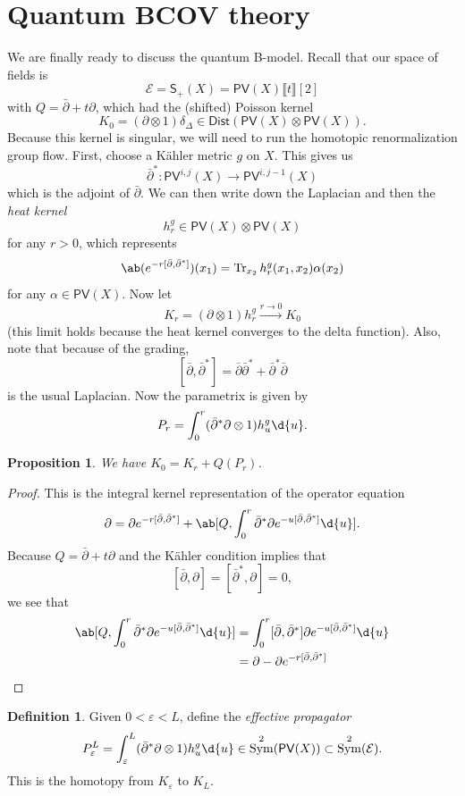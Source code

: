 \documentclass{amsart}
\newtheorem{prop}[thm]{Proposition}
\theoremstyle{definition}
\newtheorem{defn}[thm]{Definition}
\theoremstyle{remark}
\theoremstyle{plain}
\theoremstyle{definition}
\theoremstyle{remark}
\newcommand{\ep}{\varepsilon}
\newcommand{\mc}[1]{\mathcal{#1}}
\newcommand{\on}[1]{\operatorname{#1}}
\newcommand{\ms}[1]{\mathsf{#1}}
\newcommand{\1}{\mathbf{1}}
\newcommand{\2}{\mathbf{2}}
\newcommand{\3}{\mathbf{3}}
\newcommand{\ps}[1]{\lBrack #1 \rBrack}
\newcommand{\dbar}{\bar{\partial}}
\DeclareMathOperator{\Sym}{Sym}
\begin{document}
\section{Quantum BCOV theory}%
\label{sec:Quantum BCOV theory}

We are finally ready to discuss the quantum B-model. Recall that our space of fields is
\[ \mc{E} = \ms{S}_+(X) = \ms{PV}(X) \ps{t}[2] \]
with \(Q = \dbar + t \partial\), which had the (shifted) Poisson kernel
\[ K_0 = (\partial \otimes 1) \delta_{\Delta} \in \ms{Dist}(\ms{PV}(X) \otimes \ms{PV}(X)). \]
Because this kernel is singular, we will need to run the homotopic renormalization group flow. First, choose a K\"ahler metric \(g\) on \(X\). This gives us
\[ \dbar^* \colon \ms{PV}^{i,j}(X) \to \ms{PV}^{i,j-1}(X) \]
which is the adjoint of \(\dbar\). We can then write down the Laplacian and then the \textit{heat kernel}
\[ h_r^g \in \ms{PV}(X) \otimes \ms{PV}(X) \]
for any \(r > 0\), which represents
\[ \ab(e^{-r [\dbar, \dbar^*]}) (x_1) = \on{Tr}_{x_2} h_r^g (x_1, x_2) \alpha(x_2) \]
for any \(\alpha \in \ms{PV}(X)\). Now let
\[ K_r = (\partial \otimes 1) h_r^g \xrightarrow{r \to 0} K_0 \]
(this limit holds because the heat kernel converges to the delta function). Also, note that because of the grading,
\[ [\dbar, \dbar^*] = \dbar \dbar^* + \dbar^* \dbar \]
is the usual Laplacian. Now the parametrix is given by
\[ P_r = \int_0^r (\dbar^* \partial \otimes 1) h_u^g \d{u}. \]

\begin{prop}
    We have \(K_0 = K_r + Q(P_r)\).
\end{prop}

\begin{proof}
    This is the integral kernel representation of the operator equation
    \[ \partial = \partial e^{-r[\dbar, \dbar^*]} + \ab[Q, \int_0^r \dbar^* \partial e^{-u [\dbar, \dbar^*]} \d{u}]. \]
    Because \(Q = \dbar + t \partial\) and the K\"ahler condition implies that
    \[ [\dbar, \partial] = [\dbar^*, \partial] = 0, \]
    we see that
    \begin{align*}
        \ab[Q, \int_0^r \dbar^* \partial e^{-u [\dbar, \dbar^*]} \d{u}] &= \int_0^r [\dbar, \dbar^*] \partial e^{-u [\dbar, \dbar^*]} \d{u} \\
        &= \partial - \partial e^{-r [\dbar, \dbar^*]} \qedhere
    \end{align*}
\end{proof}

\begin{defn}
    Given \(0 < \ep < L\), define the \textit{effective propagator}
    \[ P_{\ep}^L = \int_{\ep}^L (\dbar^* \partial \otimes 1) h_u^g \d{u} \in \Sym^2 (\ms{PV}(X)) \subset \Sym^2(\mc{E}). \]
    This is the homotopy from \(K_{\ep}\) to \(K_L\).
\end{defn}
\end{document}
